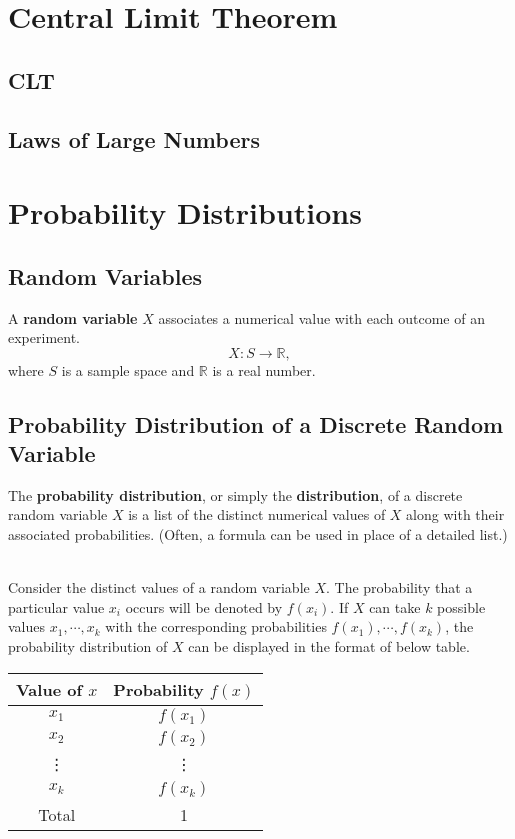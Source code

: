 \documentclass[12pt,openany]{book}
\theoremstyle{definition}
\begin{document}
	\section{Central Limit Theorem}
	\subsection{CLT}
	\subsection{Laws of Large Numbers}
	
	\section{Probability Distributions}
	
	\subsection{Random Variables}
	
	\begin{tcolorbox}[colback=white]
		A \textbf{random variable} $X$ associates a numerical value with each outcome of an experiment. \[
		X: S\to\mathbb{R},
		\] where $S$ is a sample space and $\mathbb{R}$ is a real number.
	\end{tcolorbox}
	
	\subsection{Probability Distribution of a Discrete Random Variable}
	
	\begin{tcolorbox}[colback=white]
		The \textbf{probability distribution}, or simply the \textbf{distribution}, of a discrete random variable $X$ is a list of the distinct numerical values of $X$ along with their associated probabilities. (Often, a formula can be used in place of a detailed list.)
	\end{tcolorbox}\
	\\
	Consider the distinct values of a random variable $X$. The probability that a particular value $x_i$ occurs will be denoted by $f(x_i)$. If $X$ can take $k$ possible values $x_1,\cdots,x_k$ with the corresponding probabilities $f(x_1), \cdots, f(x_k)$, the probability distribution of $X$ can be displayed in the format of below table. \begin{center}\begin{tabular}{c|c}
			\toprule[1.2pt]
			Value of $x$ & Probability $f(x)$ \\
			\hline
			$x_1$ & $f(x_1)$ \\
			$x_2$ & $f(x_2)$ \\
			\vdots & \vdots \\
			$x_k$ & $f(x_k)$ \\
			\hline
			Total & 1 \\
			\bottomrule[1.2pt]
		\end{tabular}
	\end{center}
	
\end{document}
